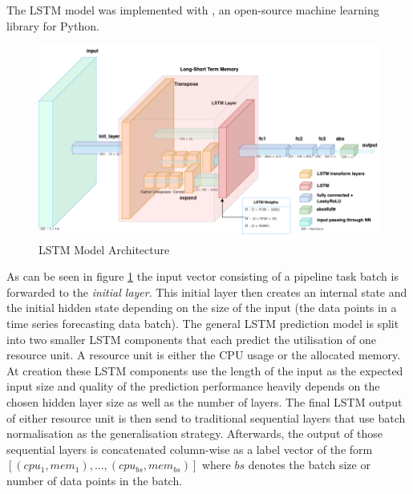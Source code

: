   The LSTM model was implemented with , an open-source machine learning library for Python.
  \begin{figure}
    \centering
    \includegraphics[scale=0.5]{figures/current_lstm_model.png}
    \caption{LSTM Model Architecture}
    \label{fig:lstm-model-architecture}
  \end{figure}
  As can be seen in figure \ref{fig:lstm-model-architecture} the input vector consisting of a pipeline task batch is forwarded to the \emph{initial layer}. This initial layer then creates an internal state and the initial hidden state depending on the size of the input (the data points in a time series forecasting data batch).
  The general LSTM prediction model is split into two smaller LSTM components that each predict the utilisation of one resource unit. A resource unit is either the CPU usage or the allocated memory. At creation these LSTM components use the length of the input as the expected input size and quality of the prediction performance heavily depends on the chosen hidden layer size as well as the number of  layers.
  The final LSTM output of either resource unit is then send to traditional sequential layers that use batch normalisation as the generalisation strategy.
  Afterwards, the output of those sequential layers is concatenated column-wise as a label vector of the form $\left[(cpu_1, mem_1), \dots, (cpu_{bs}, mem_{bs})\right]$ where $bs$ denotes the batch size or number of data points in the batch.





